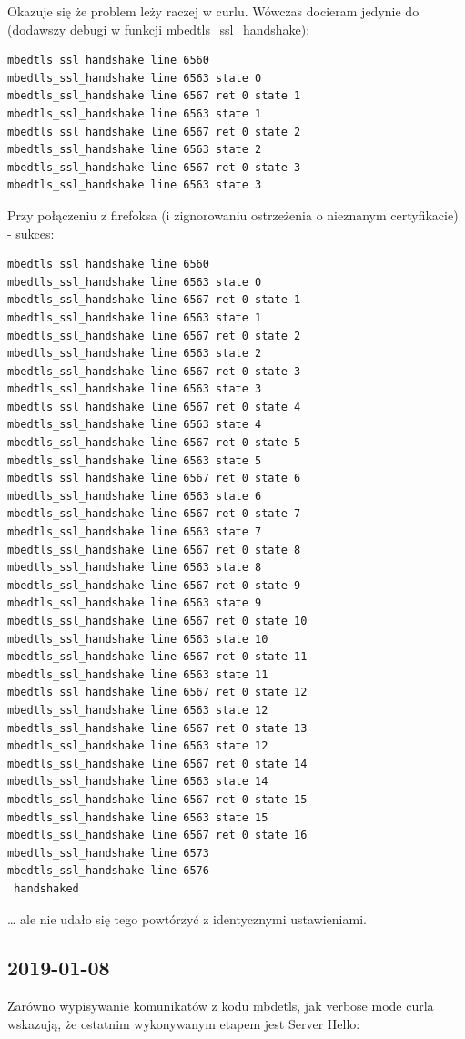 Okazuje się że problem leży raczej w curlu. Wówczas docieram jedynie do (dodawszy debugi w 
funkcji mbedtls\_ssl\_handshake):

\begin{verbatim}
mbedtls_ssl_handshake line 6560
mbedtls_ssl_handshake line 6563 state 0
mbedtls_ssl_handshake line 6567 ret 0 state 1
mbedtls_ssl_handshake line 6563 state 1
mbedtls_ssl_handshake line 6567 ret 0 state 2
mbedtls_ssl_handshake line 6563 state 2
mbedtls_ssl_handshake line 6567 ret 0 state 3
mbedtls_ssl_handshake line 6563 state 3
\end{verbatim}

Przy połączeniu z firefoksa (i zignorowaniu ostrzeżenia o nieznanym certyfikacie) - sukces:
\begin{verbatim}
mbedtls_ssl_handshake line 6560
mbedtls_ssl_handshake line 6563 state 0
mbedtls_ssl_handshake line 6567 ret 0 state 1
mbedtls_ssl_handshake line 6563 state 1
mbedtls_ssl_handshake line 6567 ret 0 state 2
mbedtls_ssl_handshake line 6563 state 2
mbedtls_ssl_handshake line 6567 ret 0 state 3
mbedtls_ssl_handshake line 6563 state 3
mbedtls_ssl_handshake line 6567 ret 0 state 4
mbedtls_ssl_handshake line 6563 state 4
mbedtls_ssl_handshake line 6567 ret 0 state 5
mbedtls_ssl_handshake line 6563 state 5
mbedtls_ssl_handshake line 6567 ret 0 state 6
mbedtls_ssl_handshake line 6563 state 6
mbedtls_ssl_handshake line 6567 ret 0 state 7
mbedtls_ssl_handshake line 6563 state 7
mbedtls_ssl_handshake line 6567 ret 0 state 8
mbedtls_ssl_handshake line 6563 state 8
mbedtls_ssl_handshake line 6567 ret 0 state 9
mbedtls_ssl_handshake line 6563 state 9
mbedtls_ssl_handshake line 6567 ret 0 state 10
mbedtls_ssl_handshake line 6563 state 10
mbedtls_ssl_handshake line 6567 ret 0 state 11
mbedtls_ssl_handshake line 6563 state 11
mbedtls_ssl_handshake line 6567 ret 0 state 12
mbedtls_ssl_handshake line 6563 state 12
mbedtls_ssl_handshake line 6567 ret 0 state 13
mbedtls_ssl_handshake line 6563 state 12
mbedtls_ssl_handshake line 6567 ret 0 state 14
mbedtls_ssl_handshake line 6563 state 14
mbedtls_ssl_handshake line 6567 ret 0 state 15
mbedtls_ssl_handshake line 6563 state 15
mbedtls_ssl_handshake line 6567 ret 0 state 16
mbedtls_ssl_handshake line 6573
mbedtls_ssl_handshake line 6576
 handshaked
\end{verbatim}

… ale nie udało się tego powtórzyć z identycznymi ustawieniami.

\subsection{2019-01-08}
Zarówno wypisywanie komunikatów z kodu mbdetls, jak verbose mode curla wskazują, że ostatnim wykonywanym etapem jest Server Hello:

